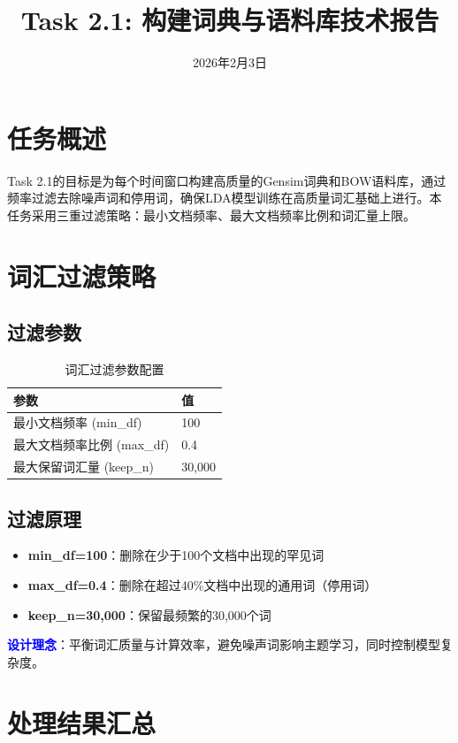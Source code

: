 \documentclass[11pt,a4paper]{article}
\title{\textbf{Task 2.1: 构建词典与语料库技术报告}}
\date{2026年2月3日}
\begin{document}
\maketitle

\section{任务概述}

Task 2.1的目标是为每个时间窗口构建高质量的Gensim词典和BOW语料库，通过频率过滤去除噪声词和停用词，确保LDA模型训练在高质量词汇基础上进行。本任务采用三重过滤策略：最小文档频率、最大文档频率比例和词汇量上限。

\section{词汇过滤策略}

\subsection{过滤参数}

\begin{table}[h]
\centering
\begin{tabular}{ll}
\toprule
\textbf{参数} & \textbf{值} \\
\midrule
最小文档频率 (min\_df) & 100 \\
最大文档频率比例 (max\_df) & 0.4 \\
最大保留词汇量 (keep\_n) & 30,000 \\
\bottomrule
\end{tabular}
\caption{词汇过滤参数配置}
\end{table}

\subsection{过滤原理}

\begin{itemize}
    \item \textbf{min\_df=100}：删除在少于100个文档中出现的罕见词
    \item \textbf{max\_df=0.4}：删除在超过40\%文档中出现的通用词（停用词）
    \item \textbf{keep\_n=30,000}：保留最频繁的30,000个词
\end{itemize}

\textcolor{blue}{\textbf{设计理念}}：平衡词汇质量与计算效率，避免噪声词影响主题学习，同时控制模型复杂度。

\section{处理结果汇总}
\end{document}
